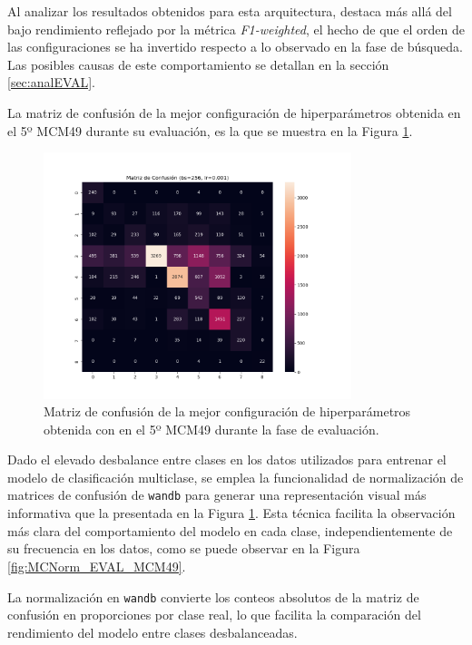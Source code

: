 Al analizar los resultados obtenidos para esta arquitectura, destaca más allá del bajo rendimiento reflejado por la métrica \textit{F1-weighted}, el hecho de que el orden de las configuraciones se ha invertido respecto a lo observado en la fase de búsqueda. Las posibles causas de este comportamiento se detallan en la sección \ref{sec:analEVAL}.

La matriz de confusión de la mejor configuración de hiperparámetros obtenida en el 5º MCM49 durante su evaluación, es la que se muestra en la Figura \ref{fig:MC_EVAL_MCM49}.

\begin{figure}[H]
    \centering
    \includegraphics[width=0.8\textwidth]{./img/evaluacion/matrices_confusion/MC_EVAL_MCM49.png}
    \caption{Matriz de confusión de la mejor configuración de hiperparámetros obtenida con en el 5º MCM49 durante la fase de evaluación.}
    \label{fig:MC_EVAL_MCM49}
\end{figure}

Dado el elevado desbalance entre clases en los datos utilizados para entrenar el modelo de clasificación multiclase, se emplea la funcionalidad de normalización de matrices de confusión de \texttt{wandb} para generar una representación visual más informativa que la presentada en la Figura \ref{fig:MC_EVAL_MCM49}. Esta técnica facilita la observación más clara del comportamiento del modelo en cada clase, independientemente de su frecuencia en los datos, como se puede observar en la Figura \ref{fig:MCNorm_EVAL_MCM49}.

La normalización en \texttt{wandb} convierte los conteos absolutos de la matriz de confusión en proporciones por clase real, lo que facilita la comparación del rendimiento del modelo entre clases desbalanceadas.

